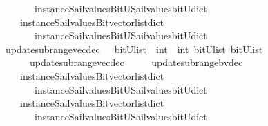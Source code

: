 \begin{isabellebody}
\ \ \ \ \ \ \ instance{\isacharunderscore}Sail{}{\isacharunderscore}values{\isacharunderscore}BitU{\isacharunderscore}Sail{}{\isacharunderscore}values{\isacharunderscore}bitU{\isacharunderscore}dict{\isacharparenright}\isanewline
\ \ \ \ {\isacharparenleft}instance{\isacharunderscore}Sail{}{\isacharunderscore}values{\isacharunderscore}Bitvector{\isacharunderscore}list{\isacharunderscore}dict\isanewline
\ \ \ \ \ \ \ instance{\isacharunderscore}Sail{}{\isacharunderscore}values{\isacharunderscore}BitU{\isacharunderscore}Sail{}{\isacharunderscore}values{\isacharunderscore}bitU{\isacharunderscore}dict{\isacharparenright}\ {\isacharparenright}{\isachardoublequoteclose}\isanewline
\isanewline
\isanewline
%
\isanewline
{}\isamarkupfalse%
\ update{\isacharunderscore}subrange{\isacharunderscore}vec{\isacharunderscore}dec\ \ {\isacharcolon}{\isacharcolon}\ {\isachardoublequoteopen}{\isacharparenleft}bitU{\isacharparenright}list\ {\isasymRightarrow}\ int\ {\isasymRightarrow}\ int\ {\isasymRightarrow}{\isacharparenleft}bitU{\isacharparenright}list\ {\isasymRightarrow}{\isacharparenleft}bitU{\isacharparenright}list\ {\isachardoublequoteclose}\ \ \ \isanewline
\ \ \ \ \ {\isachardoublequoteopen}\ update{\isacharunderscore}subrange{\isacharunderscore}vec{\isacharunderscore}dec\ {\isacharequal}\ {\isacharparenleft}\ \isanewline
\ \ update{\isacharunderscore}subrange{\isacharunderscore}bv{\isacharunderscore}dec\isanewline
\ \ \ \ {\isacharparenleft}instance{\isacharunderscore}Sail{}{\isacharunderscore}values{\isacharunderscore}Bitvector{\isacharunderscore}list{\isacharunderscore}dict\isanewline
\ \ \ \ \ \ \ instance{\isacharunderscore}Sail{}{\isacharunderscore}values{\isacharunderscore}BitU{\isacharunderscore}Sail{}{\isacharunderscore}values{\isacharunderscore}bitU{\isacharunderscore}dict{\isacharparenright}\isanewline
\ \ \ \ {\isacharparenleft}instance{\isacharunderscore}Sail{}{\isacharunderscore}values{\isacharunderscore}Bitvector{\isacharunderscore}list{\isacharunderscore}dict\isanewline
\ \ \ \ \ \ \ instance{\isacharunderscore}Sail{}{\isacharunderscore}values{\isacharunderscore}BitU{\isacharunderscore}Sail{}{\isacharunderscore}values{\isacharunderscore}bitU{\isacharunderscore}dict{\isacharparenright}\ {\isacharparenright}{\isachardoublequoteclose}\isanewline

\end{isabellebody}
